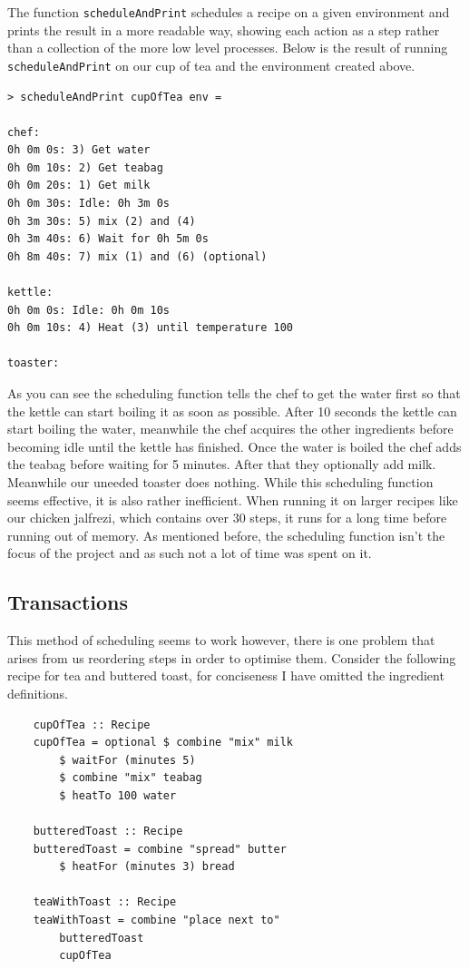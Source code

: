 \documentclass[11pt]{article}
\begin{document}
\medbreak

The function \texttt{scheduleAndPrint} schedules a recipe on a given environment
and prints the result in a more readable way, showing each action as a step rather
than a collection of the more low level processes. Below is the result of running
\texttt{scheduleAndPrint} on our cup of tea and the environment created above.

\begin{lstlisting}
> scheduleAndPrint cupOfTea env = 

chef:
0h 0m 0s: 3) Get water
0h 0m 10s: 2) Get teabag
0h 0m 20s: 1) Get milk
0h 0m 30s: Idle: 0h 3m 0s
0h 3m 30s: 5) mix (2) and (4)
0h 3m 40s: 6) Wait for 0h 5m 0s
0h 8m 40s: 7) mix (1) and (6) (optional)

kettle:
0h 0m 0s: Idle: 0h 0m 10s
0h 0m 10s: 4) Heat (3) until temperature 100

toaster:
\end{lstlisting}

As you can see the scheduling function tells the chef to get the water first so that the
kettle can start boiling it as soon as possible. After 10 seconds the kettle can start
boiling the water, meanwhile the chef acquires the other ingredients before becoming idle
until the kettle has finished. Once the water is boiled the chef adds the teabag before
waiting for 5 minutes. After that they optionally add milk. Meanwhile our uneeded toaster
does nothing. While this scheduling function seems effective, it is also rather inefficient.
When running it on larger recipes like our chicken jalfrezi, which contains over 30 steps,
it runs for a long time before running out of memory. As mentioned before, the scheduling
function isn't the focus of the project and as such not a lot of time was spent on it.

\subsection{Transactions}

This method of scheduling seems to work however, there is one problem that arises from us
reordering steps in order to optimise them. Consider the following recipe for tea and buttered toast,
for conciseness I have omitted the ingredient definitions.

\begin{lstlisting}
    cupOfTea :: Recipe
    cupOfTea = optional $ combine "mix" milk
        $ waitFor (minutes 5)
        $ combine "mix" teabag
        $ heatTo 100 water

    butteredToast :: Recipe
    butteredToast = combine "spread" butter
        $ heatFor (minutes 3) bread

    teaWithToast :: Recipe
    teaWithToast = combine "place next to"
        butteredToast
        cupOfTea
\end{lstlisting}
\end{document}
